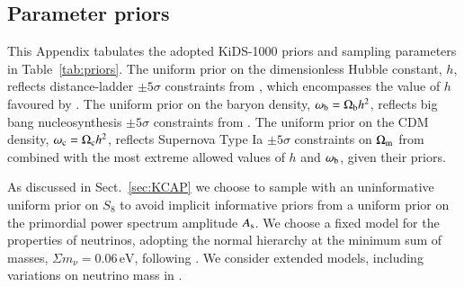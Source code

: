 \begin{appendix}
\section{Parameter priors}
\label{app:priors}
This Appendix tabulates the adopted KiDS-1000 priors and sampling parameters in Table~\ref{tab:priors}.   
The uniform prior on the dimensionless Hubble constant, $h$, reflects distance-ladder $\pm 5 \sigma$ constraints from \citet{riess/etal:2016}, which encompasses the value of $h$ favoured by \citet{planck/etal:2018}.  
The uniform prior on the baryon density, $\omega_{\rm b}= \Omega_{\rm b}h^2$, reflects big bang nucleosynthesis $\pm 5 \sigma$ constraints from \citet{olive/etal:2014}.   
The uniform prior on the CDM density, $\omega_{\rm c} = \Omega_{\rm c}h^2$, reflects Supernova Type Ia $\pm 5 \sigma$ constraints on $\Omega_{\rm m}$ from \citet{scolnic/etal:2018} combined with the most extreme allowed values of $h$ and $\omega_{\rm b}$, given their priors.   

As discussed in Sect.~\ref{sec:KCAP} we choose to sample with an uninformative uniform prior on $S_8$ to avoid implicit informative priors from a uniform prior on the primordial power spectrum amplitude $A_{\rm s}$.    
We choose a fixed model for the properties of neutrinos, adopting the normal hierarchy at the minimum sum of masses, $\Sigma m_\nu = 0.06\,\mathrm{eV}$, following \citet{planck/etal:2018}.  
We consider extended models, including variations on neutrino mass in \citet{troester/etal:inprep}.


\end{appendix}
